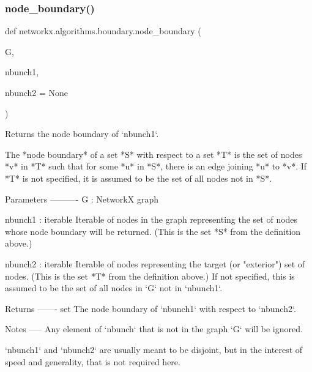 \subsubsection{\texorpdfstring{node\+\_\+boundary()}{node\_boundary()}}
{\footnotesize\ttfamily def networkx.\+algorithms.\+boundary.\+node\+\_\+boundary (\begin{DoxyParamCaption}\item[{}]{G,  }\item[{}]{nbunch1,  }\item[{}]{nbunch2 = {\ttfamily None} }\end{DoxyParamCaption})}

\begin{DoxyVerb}Returns the node boundary of `nbunch1`.

The *node boundary* of a set *S* with respect to a set *T* is the
set of nodes *v* in *T* such that for some *u* in *S*, there is an
edge joining *u* to *v*. If *T* is not specified, it is assumed to
be the set of all nodes not in *S*.

Parameters
----------
G : NetworkX graph

nbunch1 : iterable
    Iterable of nodes in the graph representing the set of nodes
    whose node boundary will be returned. (This is the set *S* from
    the definition above.)

nbunch2 : iterable
    Iterable of nodes representing the target (or "exterior") set of
    nodes. (This is the set *T* from the definition above.) If not
    specified, this is assumed to be the set of all nodes in `G`
    not in `nbunch1`.

Returns
-------
set
    The node boundary of `nbunch1` with respect to `nbunch2`.

Notes
-----
Any element of `nbunch` that is not in the graph `G` will be
ignored.

`nbunch1` and `nbunch2` are usually meant to be disjoint, but in
the interest of speed and generality, that is not required here.\end{DoxyVerb}
 